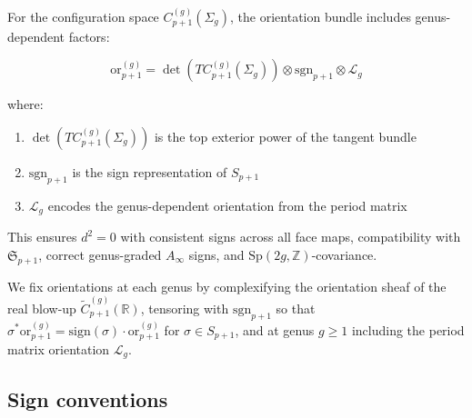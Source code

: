 \begin{definition}
For the configuration space $C_{p+1}^{(g)}(\Sigma_g)$, the orientation bundle includes genus-dependent factors:

\[\text{or}_{p+1}^{(g)} = \det(TC_{p+1}^{(g)}(\Sigma_g)) \otimes \text{sgn}_{p+1} \otimes \mathcal{L}_g\]

where:
\begin{enumerate}
\item $\det(TC_{p+1}^{(g)}(\Sigma_g))$ is the top exterior power of the tangent bundle
\item $\text{sgn}_{p+1}$ is the sign representation of $S_{p+1}$
\item $\mathcal{L}_g$ encodes the genus-dependent orientation from the period matrix
\end{enumerate}

This ensures $d^2 = 0$ with consistent signs across all face maps, compatibility with $\mathfrak{S}_{p+1}$, correct genus-graded $A_\infty$ signs, and $\text{Sp}(2g, \mathbb{Z})$-covariance.
\end{definition}

\begin{remark}
We fix orientations at each genus by complexifying the orientation sheaf of the real blow-up $\widetilde{C}_{p+1}^{(g)}(\mathbb{R})$, tensoring with $\text{sgn}_{p+1}$ so that $\sigma^* \text{or}_{p+1}^{(g)} = \text{sign}(\sigma) \cdot \text{or}_{p+1}^{(g)}$ for $\sigma \in S_{p+1}$, and at genus $g \geq 1$ including the period matrix orientation $\mathcal{L}_g$.
\end{remark}

\subsection{Sign conventions}\label{sec:sign-conventions}

